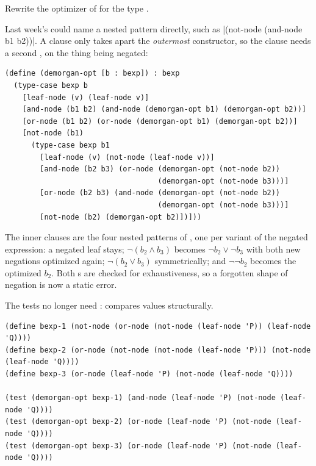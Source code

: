 \begin{exercise}
Rewrite the optimizer of  for the type .
\end{exercise}
\begin{solution}
Last week's  could name a nested pattern directly, such as \rkt|(not-node (and-node b1 b2))|. A  clause only takes apart the \emph{outermost} constructor, so the  clause needs a second , on the thing being negated:
\begin{lstlisting}
(define (demorgan-opt [b : bexp]) : bexp
  (type-case bexp b
    [leaf-node (v) (leaf-node v)]
    [and-node (b1 b2) (and-node (demorgan-opt b1) (demorgan-opt b2))]
    [or-node (b1 b2) (or-node (demorgan-opt b1) (demorgan-opt b2))]
    [not-node (b1)
      (type-case bexp b1
        [leaf-node (v) (not-node (leaf-node v))]
        [and-node (b2 b3) (or-node (demorgan-opt (not-node b2))
                                   (demorgan-opt (not-node b3)))]
        [or-node (b2 b3) (and-node (demorgan-opt (not-node b2))
                                   (demorgan-opt (not-node b3)))]
        [not-node (b2) (demorgan-opt b2)])]))
\end{lstlisting}
The inner clauses are the four nested patterns of , one per variant of the negated expression: a negated leaf stays; $\neg(b_2 \land b_3)$ becomes $\neg b_2 \lor \neg b_3$ with both new negations optimized again; $\neg(b_2 \lor b_3)$ symmetrically; and $\neg\neg b_2$ becomes the optimized $b_2$. Both s are checked for exhaustiveness, so a forgotten shape of negation is now a static error.
\end{solution}

The tests no longer need :  compares  values structurally.
\begin{lstlisting}
(define bexp-1 (not-node (or-node (not-node (leaf-node 'P)) (leaf-node 'Q))))
(define bexp-2 (or-node (not-node (not-node (leaf-node 'P))) (not-node (leaf-node 'Q))))
(define bexp-3 (or-node (leaf-node 'P) (not-node (leaf-node 'Q))))

(test (demorgan-opt bexp-1) (and-node (leaf-node 'P) (not-node (leaf-node 'Q))))
(test (demorgan-opt bexp-2) (or-node (leaf-node 'P) (not-node (leaf-node 'Q))))
(test (demorgan-opt bexp-3) (or-node (leaf-node 'P) (not-node (leaf-node 'Q))))
\end{lstlisting}

